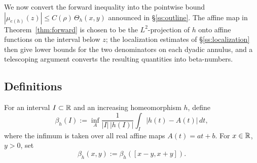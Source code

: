 We now convert the forward inequality into the pointwise bound
$|\mu_{e(h)}(z)|\le C(\rho)\,\Theta_h(x,y)$ announced in \S\ref{ss:outline}.
The affine map in Theorem~\ref{thm:forward} is chosen to be the $L^2$-projection
of $h$ onto affine functions on the interval below $z$; the localization
estimates of \S\ref{ss:localization} then give lower bounds for the two
denominators on each dyadic annulus, and a telescoping argument converts the
resulting quantities into beta-numbers.

\subsection{Definitions}

\begin{definition}\label{def:beta}
	\leanok
	For an interval $I\subset\mathbb{R}$ and an increasing homeomorphism $h$, define
	\[
	\beta_h(I):=\inf_{A}\frac{1}{|I|\,|h(I)|}\int_I|h(t)-A(t)|\,dt,
	\]
	where the infimum is taken over all real affine maps $A(t)=at+b$. For $x\in\mathbb{R}$, $y>0$, set
	\[
	\beta_h(x,y):=\beta_h([x-y,x+y]).
	\]
\end{definition}

